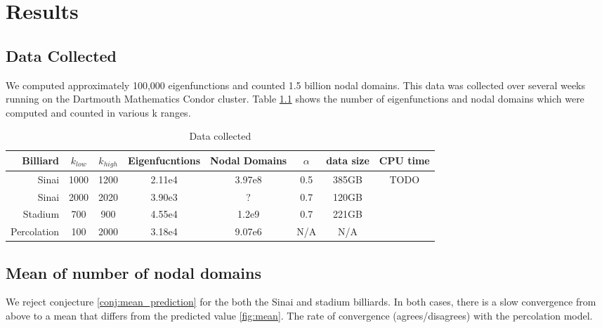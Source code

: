 \documentclass{report}
\begin{document}
\chapter{Results}

\section{Data Collected}
We computed approximately 100,000 eigenfunctions and counted 1.5 billion nodal domains. This data was collected over several weeks running on the Dartmouth Mathematics Condor cluster. Table \ref{tab:data_collected} shows the number of eigenfunctions and nodal domains which were computed and counted in various k ranges.

\begin{table}
  \centering
  \begin{tabular}{|r|c|c|c|c|c|c|c|}
    \hline
    Billiard & $k_{low}$ & $k_{high}$ & Eigenfucntions & Nodal Domains & $\alpha$ & data size & CPU time \\ \hline
    \hline
    Sinai       & 1000 & 1200 & 2.11e4 & 3.97e8 & 0.5 & 385GB & TODO \\ \hline
    Sinai       & 2000 & 2020 & 3.90e3 & ?      & 0.7 & 120GB & \\ \hline
    Stadium     & 700  & 900  & 4.55e4 & 1.2e9  & 0.7 & 221GB & \\ \hline
    Percolation & 100  & 2000 & 3.18e4 & 9.07e6 & N/A & N/A   & \\ \hline
  \end{tabular}
  \caption{Data collected}
  \label{tab:data_collected}
\end{table}



\section{Mean of number of nodal domains}
We reject conjecture \ref{conj:mean_prediction} for the both the Sinai and stadium billiards. In both cases, there is a slow convergence from above to a mean that differs from the predicted value \ref{fig:mean}. The rate of convergence (agrees/disagrees) with the percolation model.
\end{document}
